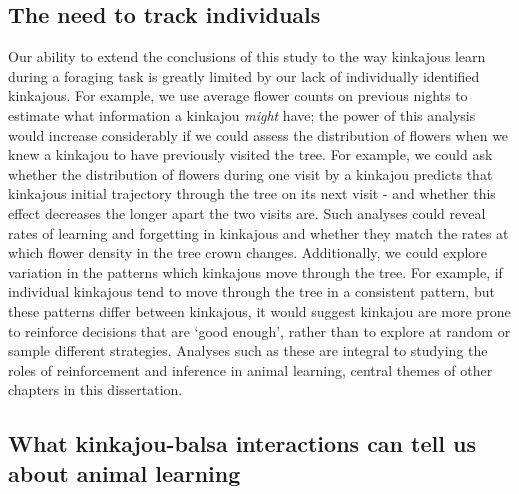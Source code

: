 \documentclass[twoside,12pt,final]{ucthesis-CA2012}
\begin{document}
\begin{ucmainmatter}
\hypertarget{the-need-to-track-individuals}{%
\subsection{The need to track individuals}\label{the-need-to-track-individuals}}

Our ability to extend the conclusions of this study to the way kinkajous learn during a foraging task is greatly limited by our lack of individually identified kinkajous. For example, we use average flower counts on previous nights to estimate what information a kinkajou \emph{might} have; the power of this analysis would increase considerably if we could assess the distribution of flowers when we knew a kinkajou to have previously visited the tree. For example, we could ask whether the distribution of flowers during one visit by a kinkajou predicts that kinkajous initial trajectory through the tree on its next visit - and whether this effect decreases the longer apart the two visits are. Such analyses could reveal rates of learning and forgetting in kinkajous and whether they match the rates at which flower density in the tree crown changes. Additionally, we could explore variation in the patterns which kinkajous move through the tree. For example, if individual kinkajous tend to move through the tree in a consistent pattern, but these patterns differ between kinkajous, it would suggest kinkajou are more prone to reinforce decisions that are `good enough', rather than to explore at random or sample different strategies. Analyses such as these are integral to studying the roles of reinforcement and inference in animal learning, central themes of other chapters in this dissertation.

\hypertarget{what-kinkajou-balsa-interactions-can-tell-us-about-animal-learning}{%
\subsection{What kinkajou-balsa interactions can tell us about animal learning}\label{what-kinkajou-balsa-interactions-can-tell-us-about-animal-learning}}


\end{ucmainmatter}
\end{document}
